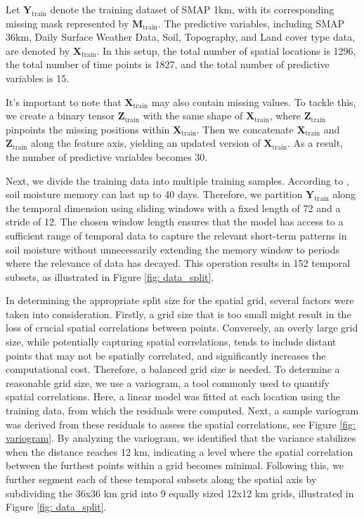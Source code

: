 \documentclass[review]{elsarticle}
\begin{document}
Let $\boldsymbol{Y}_{\text{train}}$ denote the training dataset of SMAP 1km, with its corresponding missing mask represented by $\boldsymbol{M}_{\text{train}}$. The predictive variables, including SMAP 36km, Daily Surface Weather Data, Soil, Topography, and Land cover type data, are denoted by $\boldsymbol{X}_{\text{train}}$. In this setup, the total number of spatial locations is 1296, the total number of time points is 1827, and the total number of predictive variables is 15.


It's important to note that $\boldsymbol{X}_{\text{train}}$ may also contain missing values. To tackle this, we create a binary tensor $\boldsymbol{Z}_{\text{train}}$ with the same shape of $\boldsymbol{X}_{\text{train}}$, where $\boldsymbol{Z}_{\text{train}}$ pinpoints the missing positions within $\boldsymbol{X}_{\text{train}}$. Then we concatenate $\boldsymbol{X}_{\text{train}}$ and $\boldsymbol{Z}_{\text{train}}$ along the feature axis, yielding an updated version of $\boldsymbol{X}_{\text{train}}$. As a result, the number of predictive variables becomes 30.


Next, we divide the training data into multiple training samples. According to \citet{orth2012analysis}, soil moisture memory can last up to 40 days. Therefore, we partition $\boldsymbol{Y}_{\text{train}}$ along the temporal dimension using sliding windows with a fixed length of 72 and a stride of 12.  The chosen window length ensures that the model has access to a sufficient range of temporal data to capture the relevant short-term patterns in soil moisture without unnecessarily extending the memory window to periods where the relevance of data has decayed. This operation results in 152 temporal subsets, as illustrated in Figure \ref{fig: data_split}.

In determining the appropriate split size for the spatial grid, several factors were taken into consideration. Firstly, a grid size that is too small might result in the loss of crucial spatial correlations between points. Conversely, an overly large grid size, while potentially capturing spatial correlations, tends to include distant points that may not be spatially correlated, and significantly increases the computational cost. Therefore, a balanced grid size is needed. To determine a reasonable grid size, we use a variogram, a tool commonly used to quantify spatial correlations. Here, a linear model was fitted at each location using the training data, from which the residuals were computed. Next, a sample variogram was derived from these residuals to assess the spatial correlations, see Figure \ref{fig: variogram}. By analyzing the variogram, we identified that the variance stabilizes when the distance reaches 12 km, indicating a level where the spatial correlation between the furthest points within a grid becomes minimal. Following this, we further segment each of these temporal subsets along the spatial axis by subdividing the 36x36 km grid into 9 equally sized 12x12 km grids, illustrated in Figure \ref{fig: data_split}. 
\end{document}
